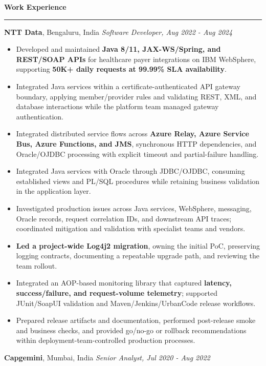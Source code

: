 \documentclass[11pt,letterpaper]{article}
\newcommand{\ressection}[1]{\Needspace{6\baselineskip}\vspace{8pt}\par\textbf{#1}\par\vspace{2pt}\hrule\vspace{5pt}}
\begin{document}
\ressection{Work Experience}
\textbf{NTT Data}, Bengaluru, India \hfill \textit{Software Developer, Aug 2022 - Aug 2024}
\begin{itemize}
  \item Developed and maintained \textbf{Java 8/11, JAX-WS/Spring, and REST/SOAP APIs} for healthcare payer integrations on IBM WebSphere, supporting \textbf{50K+ daily requests at 99.99\% SLA availability}.
  \item Integrated Java services within a certificate-authenticated API gateway boundary, applying member/provider rules and validating REST, XML, and database interactions while the platform team managed gateway authentication.
  \item Integrated distributed service flows across \textbf{Azure Relay, Azure Service Bus, Azure Functions, and JMS}, synchronous HTTP dependencies, and Oracle/OJDBC processing with explicit timeout and partial-failure handling.
  \item Integrated Java services with Oracle through JDBC/OJDBC, consuming established views and PL/SQL procedures while retaining business validation in the application layer.
  \item Investigated production issues across Java services, WebSphere, messaging, Oracle records, request correlation IDs, and downstream API traces; coordinated mitigation and validation with specialist teams and vendors.
  \item \textbf{Led a project-wide Log4j2 migration}, owning the initial PoC, preserving logging contracts, documenting a repeatable upgrade path, and reviewing the team rollout.
  \item Integrated an AOP-based monitoring library that captured \textbf{latency, success/failure, and request-volume telemetry}; supported JUnit/SoapUI validation and Maven/Jenkins/UrbanCode release workflows.
  \item Prepared release artifacts and documentation, performed post-release smoke and business checks, and provided go/no-go or rollback recommendations within deployment-team-controlled production processes.
\end{itemize}
\textbf{Capgemini}, Mumbai, India \hfill \textit{Senior Analyst, Jul 2020 - Aug 2022}
\end{document}
